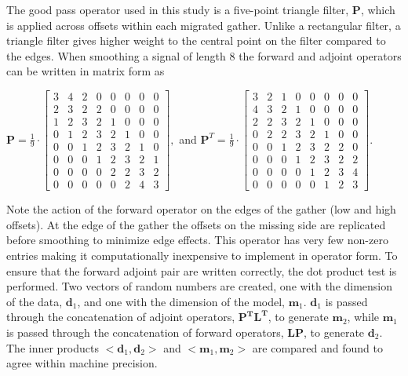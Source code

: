 The good pass operator used in this study is a five-point triangle filter, $\mathbf{P}$, which is applied across offsets within each migrated gather. Unlike a rectangular filter, a triangle filter gives higher weight to the central point on the filter compared to the edges. When smoothing a signal of length 8 the forward and adjoint operators can be written in matrix form as

$\mathbf{P} = \frac{1}{9} \cdot \begin{bmatrix} 3 & 4 & 2 & 0 & 0 & 0 & 0 & 0 \\
					        2 & 3 & 2 & 2 & 0 & 0 & 0 & 0 \\
					        1 & 2 & 3 & 2 & 1 & 0 & 0 & 0 \\
					        0 & 1 & 2 & 3 & 2 & 1 & 0 & 0 \\
					        0 & 0 & 1 & 2 & 3 & 2 & 1 & 0 \\
					        0 & 0 & 0 & 1 & 2 & 3 & 2 & 1 \\
					        0 & 0 & 0 & 0 & 2 & 2 & 3 & 2 \\
					        0 & 0 & 0 & 0 & 0 & 2 & 4 & 3 \end{bmatrix},
$ and $\mathbf{P}^T = \frac{1}{9} \cdot \begin{bmatrix}3 & 2 & 1 & 0 & 0 & 0 & 0 & 0 \\
					               4 & 3 & 2 & 1 & 0 & 0 & 0 & 0 \\
					               2 & 2 & 3 & 2 & 1 & 0 & 0 & 0 \\
					               0 & 2 & 2 & 3 & 2 & 1 & 0 & 0 \\
					               0 & 0 & 1 & 2 & 3 & 2 & 2 & 0 \\
					               0 & 0 & 0 & 1 & 2 & 3 & 2 & 2 \\
					               0 & 0 & 0 & 0 & 1 & 2 & 3 & 4 \\
					               0 & 0 & 0 & 0 & 0 & 1 & 2 & 3 \end{bmatrix}$.
					     
Note the action of the forward operator on the edges of the gather (low and high offsets). At the edge of the gather the offsets on the missing side are replicated before smoothing to minimize edge effects. This operator has very few non-zero entries making it computationally inexpensive to implement in operator form. To ensure that the forward adjoint pair are written correctly, the dot product test is performed. Two vectors of random numbers are created, one with the dimension of the data, $\mathbf{d}_1$, and one with the dimension of the model, $\mathbf{m}_1$. $\mathbf{d}_1$ is passed through the concatenation of adjoint operators, $\mathbf{P^TL^T}$, to generate $\mathbf{m}_2$, while $\mathbf{m}_1$ is passed through the concatenation of forward operators, $\mathbf{LP}$, to generate $\mathbf{d}_2$. The inner products $<\mathbf{d}_1,\mathbf{d}_2>$ and $<\mathbf{m}_1,\mathbf{m}_2>$ are compared and found to agree within machine precision. 
				     
